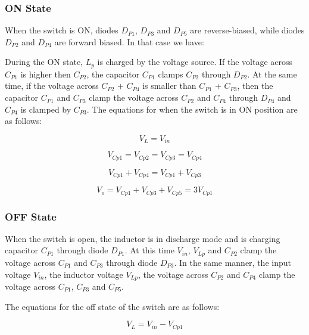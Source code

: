 \subsubsection{ON State}
When the switch is ON, diodes $D_{P1}$, $D_{P3}$ and $D_{P5}$ are reverse-biased, while diodes $D_{P2}$ and $D_{P4}$ are forward biased. In that case we have:

During the ON state, $L_p$ is charged by the voltage source. If the voltage across $C_{P1}$ is higher then $C_{P2}$, the capacitor $C_{P1}$ clamps $C_{P2}$ through $D_{P2}$. At the same time, if the voltage across $C_{P2}$ + $C_{P4}$ is smaller than $C_{P1}$ + $C_{P3}$, then the capacitor $C_{P1}$ and $C_{P3}$ clamp the voltage across $C_{P2}$ and $C_{P4}$ through $D_{P4}$ and $C_{P4}$ is clamped by $C_{P3}$. The equations for when the switch is in ON position are as follows:

\begin{equation}
	V_L = V_{in} 
	\label{eq:MBC_ON1}
\end{equation} 

\begin{equation}
	V_{Cp1} = V_{Cp2} = V_{Cp3} = V_{Cp4}
	\label{eq:MBC_ON2}
\end{equation} 

\begin{equation}
	V_{Cp1} + V_{Cp4} = V_{Cp1} + V_{Cp3}
	\label{eq:MBC_ON3}
\end{equation} 

\begin{equation}
	V_o = V_{Cp1} + V_{Cp3} + V_{Cp5} = 3V_{Cp1}
	\label{eq:MBC_ON4}
\end{equation}

\subsubsection{OFF State}
When the switch is open, the inductor is in discharge mode and is charging capacitor $C_{P1}$ through diode $D_{P1}$. At this time $V_{in}$, $V_{Lp}$ and $C_{P2}$ clamp the voltage across $C_{P1}$ and $C_{P3}$ through diode $D_{P3}$. In the same manner, the input voltage $V_{in}$, the inductor voltage $V_{Lp}$, the voltage across $C_{P2}$ and $C_{P4}$ clamp the voltage across $C_{P1}$, $C_{P3}$ and $C_{P5}$.

The equations for the off state of the switch are as follows:

\begin{equation}
	V_L = V_{in} - V_{Cp1}
	\label{eq:MBC_OFF1}
\end{equation}

